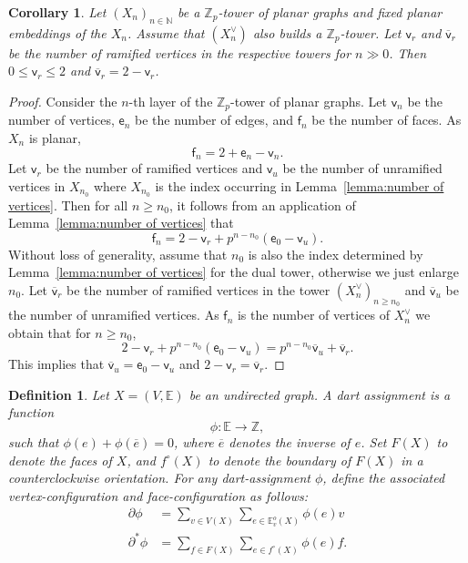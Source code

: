 \documentclass{amsart}
\newtheorem{corollary}[theorem]{Corollary}
\newtheorem{definition}[theorem]{Definition}
\numberwithin{equation}{section}
\theoremstyle{remark}
\newcommand{\Z}{\mathbb{Z}}
\newcommand{\E}{\mathbb{E}}
\theoremstyle{plain} %
\begin{document}
\begin{corollary}{
Let $(X_n)_{n\in \mathbb{N}}$ be a $\Z_p$-tower of planar graphs and fixed planar embeddings of the $X_n$.
Assume that $(X^\vee_n)$ also builds a $\Z_p$-tower.
Let $\mathsf{v}_r$ and $\overline{\mathsf{v}}_r$ be the number of ramified vertices in the respective towers for {$n\gg0$}.
Then $0\le \mathsf{v}_r\le 2$ and $\overline{\mathsf{v}}_r = 2 - \mathsf{v}_r$.
}
\end{corollary}
\begin{proof}
{Consider the $n$-th layer of the $\Z_p$-tower of planar graphs.
Let $\mathsf{v}_n$ be the number of vertices, $\mathsf{e}_n$ be the number of edges, and $\mathsf{f}_n$ be the number of faces. As $X_n$ is planar,
\[
\mathsf{f}_n = 2 + \mathsf{e}_n - \mathsf{v}_n.
\]
Let $\mathsf{v}_r$ be the number of ramified vertices and $\mathsf{v}_u$ be the number of unramified vertices in $X_{n_0}$ where $X_{n_0}$ is the index occurring in Lemma~\ref{lemma:number of vertices}.
Then for all $n\ge n_0$, it follows from an application of Lemma~\ref{lemma:number of vertices} that
\[
\mathsf{f}_n = 2 - \mathsf{v}_r + p^{n-n_0}(\mathsf{e}_0 - \mathsf{v}_u).
\]
Without loss of generality, assume that $n_0$ is also the index determined by Lemma~\ref{lemma:number of vertices} for the dual tower, otherwise we just enlarge $n_0$.
Let $\overline{\mathsf{v}}_{r}$ be the number of ramified vertices in the tower $(X_n^\vee)_{n\ge n_0}$ and $\overline{\mathsf{v}}_{u}$ be the number of unramified vertices.
As $\mathsf{f}_n$ is the number of vertices of $X_n^\vee$ we obtain that for $n \ge n_0$,
\[
2 - \mathsf{v}_r + p^{n-n_0}(\mathsf{e}_0 - \mathsf{v}_u) = p^{n-n_0}\overline{\mathsf{v}}_u + \overline{\mathsf{v}}_r.
\]
This implies that $\overline{\mathsf{v}}_u = \mathsf{e}_0 - \mathsf{v}_u$ and $2-\mathsf{v}_r=\overline{\mathsf{v}}_r$.}
\end{proof}

\begin{definition}
Let $X=(V,\E)$ be an {un}directed graph.
A \emph{dart assignment} is a function
\[
{\phi}\colon \E \longrightarrow \Z,
\]
such that ${\phi}(e)+{\phi}(\overline{e})=0$, where $\overline{e}$ denotes the inverse of $e$.
Set $F(X)$ to denote the faces of $X$, and $f^\circ(X)$ to denote the boundary of $F(X)$ in a counterclockwise orientation.
{For any dart-assignment $\phi$, define the associated \emph{vertex-configuration} and \emph{face-configuration} as follows:}
\begin{align*}
\partial {\phi} & =\sum_{v\in V(X)}\sum_{e\in \E^o_v(X)}{\phi}(e)v \\
\partial^* {\phi} & =\sum_{f\in F(X)} \sum_{e\in f^\circ(X)} {\phi}(e)f.
\end{align*}
\end{definition}
\end{document}
